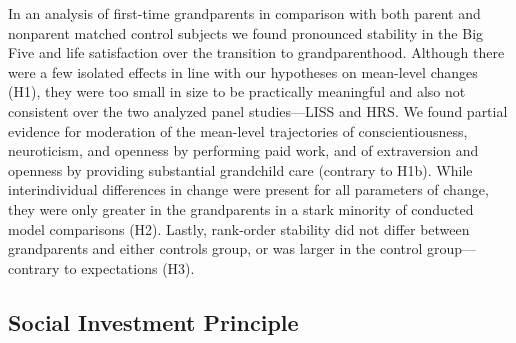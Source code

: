\documentclass[
  english,
  man, noextraspace]{apa7}
\begin{document}
In an analysis of first-time grandparents in comparison with both parent and nonparent matched control subjects we found pronounced stability in the Big Five and life satisfaction over the transition to grandparenthood. Although there were a few isolated effects in line with our hypotheses on mean-level changes (H1), they were too small in size to be practically meaningful and also not consistent over the two analyzed panel studies---LISS and HRS. We found partial evidence for moderation of the mean-level trajectories of conscientiousness, neuroticism, and openness by performing paid work, and of extraversion and openness by providing substantial grandchild care (contrary to H1b). While interindividual differences in change were present for all parameters of change, they were only greater in the grandparents in a stark minority of conducted model comparisons (H2). Lastly, rank-order stability did not differ between grandparents and either controls group, or was larger in the control group---contrary to expectations (H3).

\hypertarget{social-investment-principle}{%
\subsection{Social Investment Principle}\label{social-investment-principle}}
\end{document}
